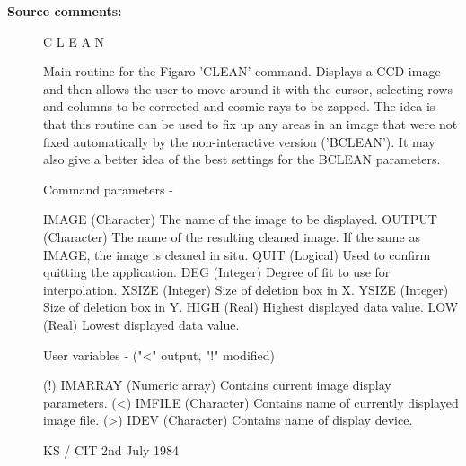 \begin{description}
\item [\textbf{Source comments:}]
\begin{terminalv}
 C L E A N

 Main routine for the Figaro 'CLEAN' command.  Displays
 a CCD image and then allows the user to move around it with
 the cursor, selecting rows and columns to be corrected and
 cosmic rays to be zapped.  The idea is that this routine can
 be used to fix up any areas in an image that were not fixed
 automatically by the non-interactive version ('BCLEAN').  It
 may also give a better idea of the best settings for the
 BCLEAN parameters.

 Command parameters -

 IMAGE      (Character) The name of the image to be displayed.
 OUTPUT     (Character) The name of the resulting cleaned image.
            If the same as IMAGE, the image is cleaned in situ.
 QUIT       (Logical) Used to confirm quitting the application.
 DEG        (Integer) Degree of fit to use for interpolation.
 XSIZE      (Integer) Size of deletion box in X.
 YSIZE      (Integer) Size of deletion box in Y.
 HIGH       (Real) Highest displayed data value.
 LOW        (Real) Lowest displayed data value.

 User variables -  ("<" output, "!" modified)

 (!) IMARRAY (Numeric array) Contains current image display
             parameters.
 (<) IMFILE  (Character) Contains name of currently displayed
             image file.
 (>) IDEV    (Character) Contains name of display device.

                                    KS / CIT 2nd July 1984
\end{terminalv}
\end{description}
